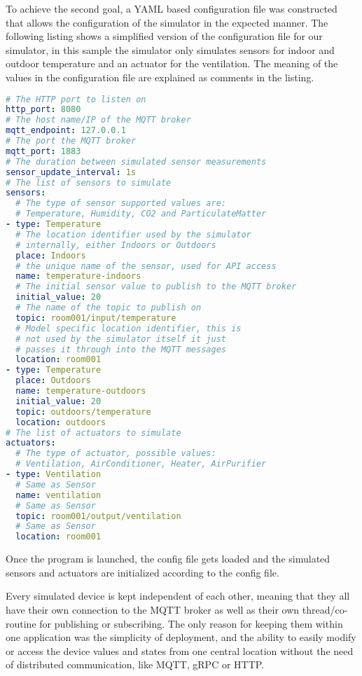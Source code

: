 To achieve the second goal, a YAML based configuration file was
constructed that allows the configuration of the simulator in the
expected manner.
The following listing shows a simplified version of the
configuration file for our simulator, in this sample the simulator only
simulates sensors for indoor and outdoor temperature and an actuator for
the ventilation.
The meaning of the values in the configuration file are explained as comments in the listing.

\begin{lstlisting}[language=yaml, 
  caption={Sample configuration file for the simulator}, 
  captionpos=b]
# The HTTP port to listen on
http_port: 8080
# The host name/IP of the MQTT broker
mqtt_endpoint: 127.0.0.1
# The port the MQTT broker
mqtt_port: 1883
# The duration between simulated sensor measurements
sensor_update_interval: 1s
# The list of sensors to simulate
sensors:
  # The type of sensor supported values are:
  # Temperature, Humidity, CO2 and ParticulateMatter
- type: Temperature
  # The location identifier used by the simulator
  # internally, either Indoors or Outdoors
  place: Indoors
  # the unique name of the sensor, used for API access
  name: temperature-indoors
  # The initial sensor value to publish to the MQTT broker
  initial_value: 20
  # The name of the topic to publish on
  topic: room001/input/temperature
  # Model specific location identifier, this is
  # not used by the simulator itself it just
  # passes it through into the MQTT messages
  location: room001
- type: Temperature
  place: Outdoors
  name: temperature-outdoors
  initial_value: 20
  topic: outdoors/temperature
  location: outdoors
# The list of actuators to simulate
actuators:
  # The type of actuator, possible values:
  # Ventilation, AirConditioner, Heater, AirPurifier
- type: Ventilation
  # Same as Sensor
  name: ventilation
  # Same as Sensor
  topic: room001/output/ventilation
  # Same as Sensor
  location: room001
\end{lstlisting}

Once the program is launched, the config file gets loaded and the
simulated sensors and actuators are initialized according to the config
file.

Every simulated device is kept independent of each other, meaning that
they all have their own connection to the MQTT broker as well as their
own thread/co-routine for publishing or subscribing.
The only reason for
keeping them within one application was the simplicity of deployment, and
the ability to easily modify or access the device values and states from
one central location without the need of distributed communication, like
MQTT, gRPC or HTTP.


